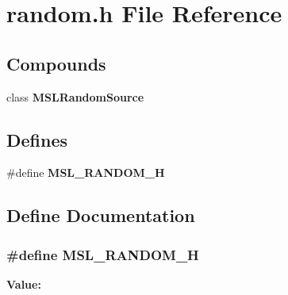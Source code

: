 \section{random.h File Reference}
\label{random_8h}
\subsection*{Compounds}
\begin{CompactItemize}
\item 
class {\bf MSLRandom\-Source}
\end{CompactItemize}
\subsection*{Defines}
\begin{CompactItemize}
\item 
\#define {\bf MSL\_\-RANDOM\_\-H}
\end{CompactItemize}


\subsection{Define Documentation}
\subsubsection{\setlength{\rightskip}{0pt plus 5cm}\#define MSL\_\-RANDOM\_\-H}\label{random_8h_a0}


{\bf Value:}\footnotesize\begin{verbatim}
\end{verbatim}\normalsize 

